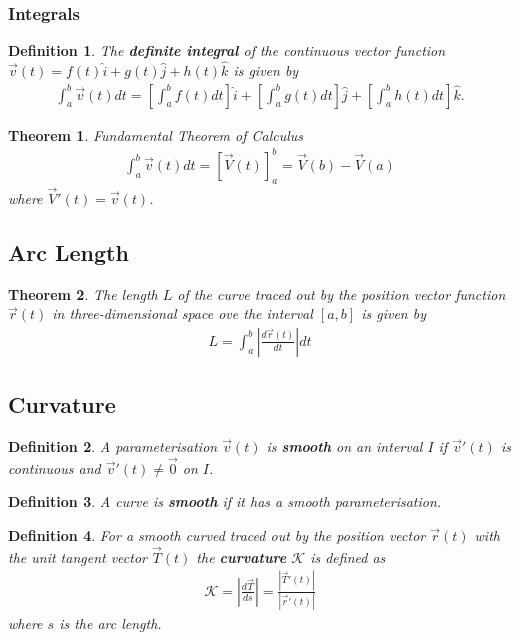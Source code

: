 \documentclass{article}
\theoremstyle{sltheorem}
\newtheorem{definition}{Definition}[section]
\newtheorem{theorem}{Theorem}[section]
\newcommand{\ih}{\widehat i}
\newcommand{\jh}{\widehat j}
\newcommand{\kh}{\widehat k}
\newcommand*\B[1]{\textbf{#1}}
\begin{document}
\subsubsection{Integrals}
\begin{definition}
    The \B{definite integral} of the continuous vector function $\vec v(t)=f(t)\ih + g(t)\jh + h(t)\kh$ is given by
    \begin{align*}
        \int_a^b \vec v(t)dt = \left[\int_a^b f(t)dt\right]\ih + \left[\int_a^b g(t) dt\right]\jh + \left[\int_a^b h(t)dt\right] \kh.
    \end{align*}
\end{definition}
\begin{theorem}{Fundamental Theorem of Calculus}
    \begin{align*}
        \int_a^b \vec v(t) dt = \left[\vec V(t)\right]^b_a = \vec V(b) - \vec V(a)
    \end{align*} 
    where $\vec V'(t) = \vec v(t)$.
\end{theorem}
\subsection{Arc Length}
\begin{theorem}
    The length $L$ of the curve traced out by the position vector function $\vec r(t)$ in three-dimensional space ove the interval
    $[a,b]$ is given by
    \begin{align*}
        L = \int_a^b \left|\frac{d\vec r(t)}{dt}\right| dt
    \end{align*}
\end{theorem}
\subsection{Curvature}
\begin{definition}
    A parameterisation $\vec v(t)$ is \B{smooth} on an interval $I$ if $\vec v'(t)$ is continuous and $\vec v'(t) \not = \vec 0$ on $I$.
\end{definition}
\begin{definition}
    A curve is \B{smooth} if it has a smooth parameterisation.
\end{definition}
\begin{definition}
    For a smooth curved traced out by the position vector $\vec r(t)$ with the unit tangent vector 
    $\vec T(t)$ the \B{curvature} $\mathcal{K}$ is defined as
    \begin{align*}
        \mathcal{K} = \left|\frac{d\vec T}{ds}\right|=\frac{\left| \vec T'(t)\right|}{\left|\vec r'(t)\right|}
    \end{align*}
    where $s$ is the arc length.
\end{definition}
\end{document}
